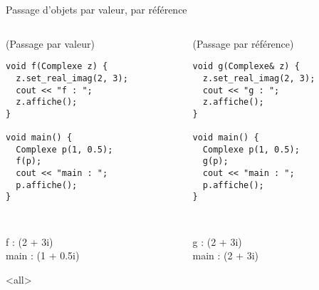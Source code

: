 \documentclass[c]{beamer}
\begin{document}
\begin{frame}[fragile]{Passage d'objets par valeur, par référence}
 \begin{columns}
\begin{column}{0.5\columnwidth}
\begin{cbox}[][lwuc][\footnotesize](Passage par valeur)
\begin{verbatim}
void f(Complexe z) {
  z.set_real_imag(2, 3);
  cout << "f : ";
  z.affiche();
}

void main() {
  Complexe p(1, 0.5);
  f(p);
  cout << "main : ";
  p.affiche();
}
\end{verbatim}

\tt
\begin{cbox}
f : (2 + 3i)\\
main : (1 + 0.5i)
\end{cbox}

\onslide<all>
\end{cbox}
\end{column}
\begin{column}{0.5\columnwidth}
\begin{cbox}[][lwuc][\footnotesize](Passage par référence)
\begin{verbatim}
void g(Complexe& z) {
  z.set_real_imag(2, 3);
  cout << "g : ";
  z.affiche();
}

void main() {
  Complexe p(1, 0.5);
  g(p);
  cout << "main : ";
  p.affiche();
}
\end{verbatim}

\tt
\begin{cbox}
g : (2 + 3i)\\
main : (2 + 3i)
\end{cbox}
\end{cbox}
\end{column}
\end{columns}
\end{frame}

\end{document}
